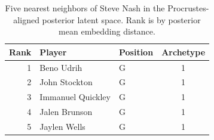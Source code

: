 \begin{table}[htbp]
  \centering\small
  \begin{tabular}{rllc}
    \toprule
    Rank & Player & Position & Archetype \\
    \midrule
    1 & Beno Udrih & G & 1 \\
    2 & John Stockton & G & 1 \\
    3 & Immanuel Quickley & G & 1 \\
    4 & Jalen Brunson & G & 1 \\
    5 & Jaylen Wells & G & 1 \\
    \bottomrule
  \end{tabular}
  \caption{Five nearest neighbors of Steve Nash in the Procrustes-aligned posterior latent space. Rank is by posterior mean embedding distance.}
  \label{tab:Steve_Nash_neighbors}
\end{table}

